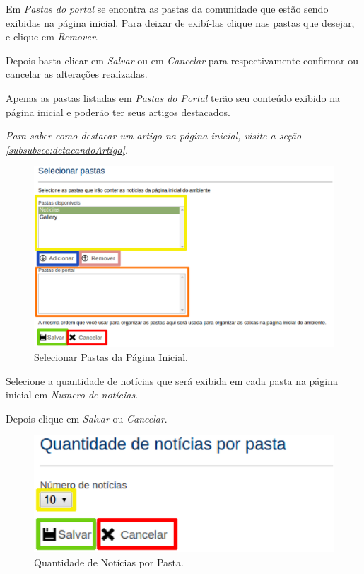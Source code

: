 Em \emph{\color{orange}Pastas do portal} se encontra as pastas da comunidade que estão sendo exibidas na página inicial. Para deixar de exibí-las clique nas pastas que desejar, e clique em \emph{\color{pink}Remover}.

Depois basta clicar em \emph{\color{green}Salvar} ou em \emph{\color{red}Cancelar} para respectivamente confirmar ou cancelar as alterações realizadas.

Apenas as pastas listadas em \emph{\color{orange}Pastas do Portal} terão seu conteúdo exibido na página inicial e poderão ter seus artigos destacados.

\emph{Para saber como destacar um artigo na página inicial, visite a seção \ref{subsubsec:detacandoArtigo}.}

\begin{figure}[h]
     \centering
       \includegraphics[keepaspectratio=true,scale=0.45]{figuras/selecionarPastasPaginaInicial.eps}
     \caption{Selecionar Pastas da Página Inicial.}
     \label{fig:adminPaginaInicial}
\end{figure}

Selecione a quantidade de notícias que será exibida em cada pasta na página inicial em \emph{\color{yellow}Numero de notícias}.

Depois clique em \emph{\color{green}Salvar} ou \emph{\color{red}Cancelar}.
\begin{figure}[h]
     \centering
       \includegraphics[keepaspectratio=true,scale=0.49]{figuras/qtdNoticiasPorPastas.eps}
     \caption{Quantidade de Notícias por Pasta.}
     \label{fig:qtdNoticiasPorPasta}
\end{figure}

